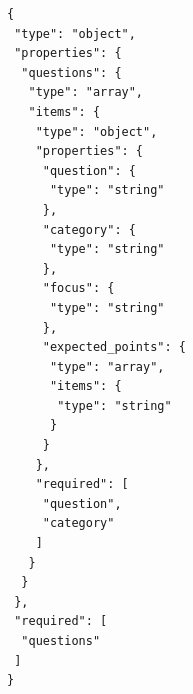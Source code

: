 \begin{lstlisting}[style=adamjson]
{
 "type": "object",
 "properties": {
  "questions": {
   "type": "array",
   "items": {
    "type": "object",
    "properties": {
     "question": {
      "type": "string"
     },
     "category": {
      "type": "string"
     },
     "focus": {
      "type": "string"
     },
     "expected_points": {
      "type": "array",
      "items": {
       "type": "string"
      }
     }
    },
    "required": [
     "question",
     "category"
    ]
   }
  }
 },
 "required": [
  "questions"
 ]
}
\end{lstlisting}
